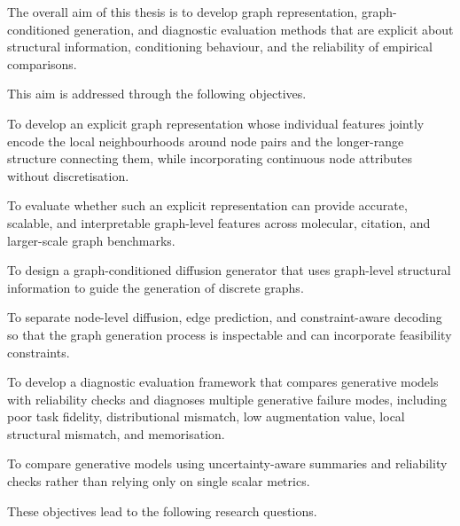 The overall aim of this thesis is to develop graph representation,
graph-conditioned generation, and diagnostic evaluation methods that are
explicit about structural information, conditioning behaviour, and the
reliability of empirical comparisons.

This aim is addressed through the following objectives.

\begin{description}[leftmargin=0pt,style=nextline]
    \item[O1.]
    To develop an explicit graph representation whose individual features jointly encode the local neighbourhoods around node pairs and the longer-range structure connecting them, while incorporating continuous node attributes without discretisation.
    \item[O2.]
    To evaluate whether such an explicit representation can provide accurate,
    scalable, and interpretable graph-level features across molecular,
    citation, and larger-scale graph benchmarks.

    \item[O3.]
    To design a graph-conditioned diffusion generator that uses graph-level
    structural information to guide the generation of discrete graphs.

    \item[O4.]
    To separate node-level diffusion, edge prediction, and constraint-aware
    decoding so that the graph generation process is inspectable and can
    incorporate feasibility constraints.

    \item[O5.]
    To develop a diagnostic evaluation framework that compares generative
    models with reliability checks and diagnoses multiple generative failure
    modes, including poor task fidelity,
    distributional mismatch, low augmentation value, local structural
    mismatch, and memorisation.

    \item[O6.]
    To compare generative models using uncertainty-aware summaries and
    reliability checks rather than relying only on single scalar metrics.
\end{description}

These objectives lead to the following research questions.


